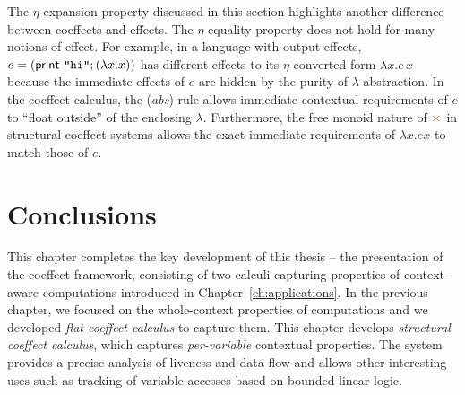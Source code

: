 \noindent
The $\eta$-expansion property discussed in this section highlights another difference 
between coeffects and effects. The $\eta$-equality property does not hold for many notions 
of effect. For example, in a language with output effects, $e = (\textsf{print \texttt{"hi"}}; (\lambda x . x))$ 
has different effects to its $\eta$-converted form $\lambda x . e\,x$ because the immediate 
effects of $e$ are hidden by the purity of $\lambda$-abstraction. In the coeffect calculus, 
the (\emph{abs}) rule allows immediate contextual requirements of $e$ to ``float outside'' 
of the enclosing $\lambda$. Furthermore, the free monoid nature of $\atimes$ in structural 
coeffect systems allows the exact immediate requirements of $\lambda x . e x$ to match 
those of $e$. 

                                                                          
%
%
                                                                          

\section{Conclusions}

This chapter completes the key development of this thesis -- the presentation of the coeffect 
framework, consisting of two calculi capturing properties of context-aware computations introduced
in Chapter~\ref{ch:applications}. In the previous chapter, we focused on the whole-context 
properties of computations and we developed \emph{flat coeffect calculus} to capture them.
This chapter develops \emph{structural coeffect calculus}, which captures \emph{per-variable}
contextual properties. The system provides a precise analysis of liveness and data-flow and allows 
other interesting uses such as tracking of variable accesses based on bounded linear logic.


